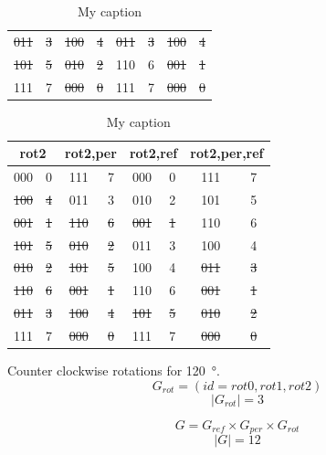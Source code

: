 \documentclass{ijuc}
\begin{document}
\begin{table}
\begin{center}
\begin{tabular}{cc|cc|cc|cc}
\sout{011} & \sout{3}     & \sout{100} & \sout{4}         & \sout{011} & \sout{3}         & \sout{100} & \sout{4}            \\
\sout{101} & \sout{5}     & \sout{010} & \sout{2}         &       110  &       6          & \sout{001} & \sout{1}            \\
      111  &       7      & \sout{000} & \sout{0}         &       111  &       7          & \sout{000} & \sout{0}            \\
\end{tabular}
\begin{tabular}{cc|cc|cc|cc}
\multicolumn{2}{c|}{rot2} & \multicolumn{2}{c|}{rot2,per} & \multicolumn{2}{c|}{rot2,ref} & \multicolumn{2}{c}{rot2,per,ref} \\ \hline
      000  &       0      &       111  &       7          &       000  &       0          &       111  &       7             \\
\sout{100} & \sout{4}     &       011  &       3          &       010  &       2          &       101  &       5             \\
\sout{001} & \sout{1}     & \sout{110} & \sout{6}         & \sout{001} & \sout{1}         &       110  &       6             \\
\sout{101} & \sout{5}     & \sout{010} & \sout{2}         &       011  &       3          &       100  &       4             \\
\sout{010} & \sout{2}     & \sout{101} & \sout{5}         &       100  &       4          & \sout{011} & \sout{3}            \\
\sout{110} & \sout{6}     & \sout{001} & \sout{1}         &       110  &       6          & \sout{001} & \sout{1}            \\
\sout{011} & \sout{3}     & \sout{100} & \sout{4}         & \sout{101} & \sout{5}         & \sout{010} & \sout{2}            \\
      111  &       7      & \sout{000} & \sout{0}         &       111  &       7          & \sout{000} & \sout{0}            \\
\end{tabular}
\end{center}
\caption{My caption}
\label{tbl-trid}
\end{table}

Counter clockwise rotations for \SI{120}{\degree}.
\[ G_{rot} = (id=rot0, rot1, rot2) \]
\[ \vert G_{rot} \vert = 3 \]

\[ G = G_{ref} \times G_{per} \times G_{rot} \]
\[ \vert G \vert = 12 \]
\end{document}
